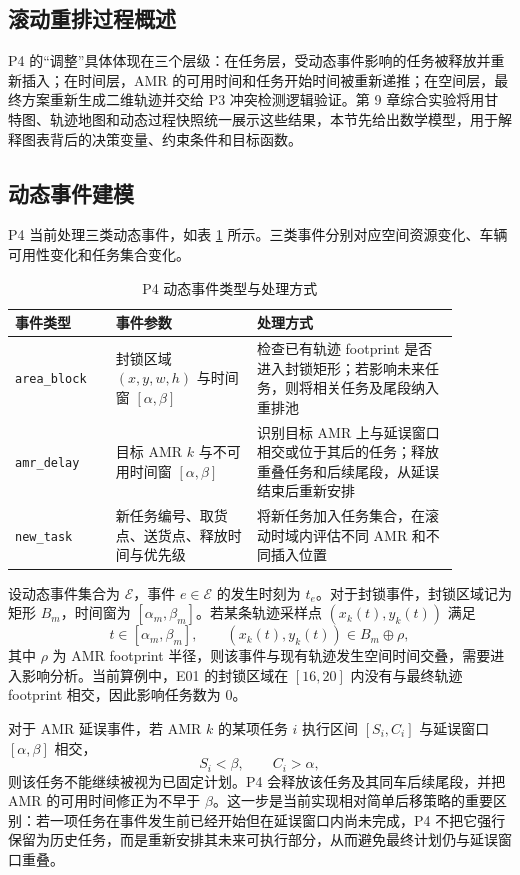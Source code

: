 \subsection{滚动重排过程概述}

P4 的“调整”具体体现在三个层级：在任务层，受动态事件影响的任务被释放并重新插入；在时间层，AMR 的可用时间和任务开始时间被重新递推；在空间层，最终方案重新生成二维轨迹并交给 P3 冲突检测逻辑验证。第 9 章综合实验将用甘特图、轨迹地图和动态过程快照统一展示这些结果，本节先给出数学模型，用于解释图表背后的决策变量、约束条件和目标函数。

\subsection{动态事件建模}

P4 当前处理三类动态事件，如表 \ref{tab:p4-event-types} 所示。三类事件分别对应空间资源变化、车辆可用性变化和任务集合变化。

\begin{table}[H]
\centering
\small
\begin{tabular}{p{0.20\linewidth}p{0.28\linewidth}p{0.40\linewidth}}
\toprule
事件类型 & 事件参数 & 处理方式 \\
\midrule
\verb|area_block| & 封锁区域 $(x,y,w,h)$ 与时间窗 $[\alpha,\beta]$ & 检查已有轨迹 footprint 是否进入封锁矩形；若影响未来任务，则将相关任务及尾段纳入重排池 \\
\verb|amr_delay| & 目标 AMR $k$ 与不可用时间窗 $[\alpha,\beta]$ & 识别目标 AMR 上与延误窗口相交或位于其后的任务；释放重叠任务和后续尾段，从延误结束后重新安排 \\
\verb|new_task| & 新任务编号、取货点、送货点、释放时间与优先级 & 将新任务加入任务集合，在滚动时域内评估不同 AMR 和不同插入位置 \\
\bottomrule
\end{tabular}
\caption{P4 动态事件类型与处理方式}
\label{tab:p4-event-types}
\end{table}

设动态事件集合为 $\mathcal{E}$，事件 $e\in\mathcal{E}$ 的发生时刻为 $t_e$。对于封锁事件，封锁区域记为矩形 $B_m$，时间窗为 $[\alpha_m,\beta_m]$。若某条轨迹采样点 $(x_k(t),y_k(t))$ 满足
\[
t\in[\alpha_m,\beta_m],\qquad (x_k(t),y_k(t))\in B_m\oplus \rho,
\]
其中 $\rho$ 为 AMR footprint 半径，则该事件与现有轨迹发生空间时间交叠，需要进入影响分析。当前算例中，E01 的封锁区域在 $[16,20]$ 内没有与最终轨迹 footprint 相交，因此影响任务数为 0。

对于 AMR 延误事件，若 AMR $k$ 的某项任务 $i$ 执行区间 $[S_i,C_i]$ 与延误窗口 $[\alpha,\beta]$ 相交，
\[
S_i<\beta,\qquad C_i>\alpha,
\]
则该任务不能继续被视为已固定计划。P4 会释放该任务及其同车后续尾段，并把 AMR 的可用时间修正为不早于 $\beta$。这一步是当前实现相对简单后移策略的重要区别：若一项任务在事件发生前已经开始但在延误窗口内尚未完成，P4 不把它强行保留为历史任务，而是重新安排其未来可执行部分，从而避免最终计划仍与延误窗口重叠。


